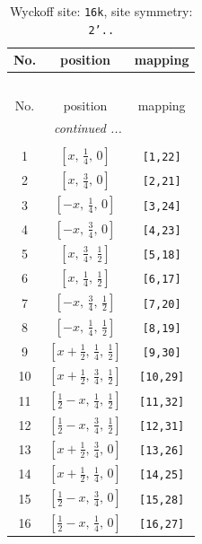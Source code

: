 \documentclass[fleqn,8pt]{jsarticle}
\begin{document}
\renewcommand{\arraystretch}{1.2}
\begin{longtable}{ccc}
\caption{Wyckoff site: {\tt 16k}, site symmetry: {\tt 2'..}}
 \\
 \hline \hline
No. & position & mapping \\ \hline \endfirsthead

\multicolumn{2}{l}{\tablename\ \thetable{}} \\
 \hline \hline
No. & position & mapping \\ \hline \endhead

 \hline \hline
\multicolumn{2}{r}{\footnotesize\it continued ...} \\ \endfoot

 \hline \hline
\multicolumn{2}{r}{} \\ \endlastfoot

1 & $\left[ x,\, \frac{1}{4},\, 0 \right]$ & {\tt [1,22]} \\ \hline
2 & $\left[ x,\, \frac{3}{4},\, 0 \right]$ & {\tt [2,21]} \\ \hline
3 & $\left[ - x,\, \frac{1}{4},\, 0 \right]$ & {\tt [3,24]} \\ \hline
4 & $\left[ - x,\, \frac{3}{4},\, 0 \right]$ & {\tt [4,23]} \\ \hline
5 & $\left[ x,\, \frac{3}{4},\, \frac{1}{2} \right]$ & {\tt [5,18]} \\ \hline
6 & $\left[ x,\, \frac{1}{4},\, \frac{1}{2} \right]$ & {\tt [6,17]} \\ \hline
7 & $\left[ - x,\, \frac{3}{4},\, \frac{1}{2} \right]$ & {\tt [7,20]} \\ \hline
8 & $\left[ - x,\, \frac{1}{4},\, \frac{1}{2} \right]$ & {\tt [8,19]} \\ \hline
9 & $\left[ x + \frac{1}{2},\, \frac{1}{4},\, \frac{1}{2} \right]$ & {\tt [9,30]} \\ \hline
10 & $\left[ x + \frac{1}{2},\, \frac{3}{4},\, \frac{1}{2} \right]$ & {\tt [10,29]} \\ \hline
11 & $\left[ \frac{1}{2} - x,\, \frac{1}{4},\, \frac{1}{2} \right]$ & {\tt [11,32]} \\ \hline
12 & $\left[ \frac{1}{2} - x,\, \frac{3}{4},\, \frac{1}{2} \right]$ & {\tt [12,31]} \\ \hline
13 & $\left[ x + \frac{1}{2},\, \frac{3}{4},\, 0 \right]$ & {\tt [13,26]} \\ \hline
14 & $\left[ x + \frac{1}{2},\, \frac{1}{4},\, 0 \right]$ & {\tt [14,25]} \\ \hline
15 & $\left[ \frac{1}{2} - x,\, \frac{3}{4},\, 0 \right]$ & {\tt [15,28]} \\ \hline
16 & $\left[ \frac{1}{2} - x,\, \frac{1}{4},\, 0 \right]$ & {\tt [16,27]} \\
\end{longtable}
\end{document}
